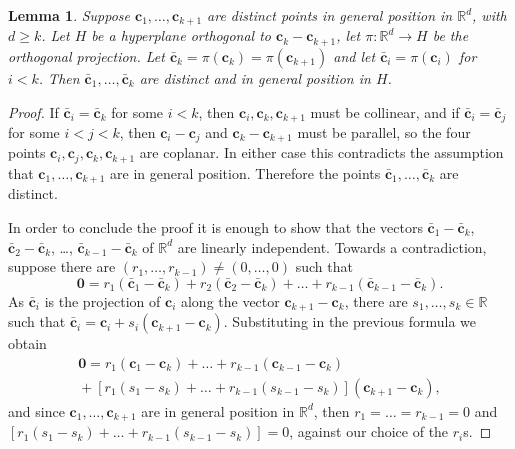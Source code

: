 \documentclass[12pt]{amsart}
\newcommand{\R}{\mathbb{R}}	%
\theoremstyle{plain}
\newtheorem{lemma}[theorem]{Lemma}
\theoremstyle{definition}
\theoremstyle{remark}
\begin{document}
\begin{lemma}\label{lem:projectiogeneralposition}
Suppose \( \mathbf{c}_1 , \dots , \mathbf{c}_{ k + 1 } \) are distinct points in general position in \( \R^d \), with \( d \geq k \).
Let \( H \) be a hyperplane orthogonal to \( \mathbf{c}_k - \mathbf{c}_{ k + 1 } \), let \( \pi \colon \R^d \to H \) be the orthogonal projection.
Let \( \bar{\mathbf{c}}_k = \pi ( \mathbf{c}_k ) = \pi ( \mathbf{c}_{ k + 1 } ) \) and let \( \bar{\mathbf{c}}_i = \pi ( \mathbf{c}_i ) \) for \( i < k \).
Then \( \bar{\mathbf{c}}_1 , \dots , \bar{\mathbf{c}}_k \) are distinct and in general position in \( H \).
\end{lemma}

\begin{proof}
If \( \bar{\mathbf{c}}_i = \bar{\mathbf{c}}_k \) for some \( i < k \), then \( \mathbf{c}_i , \mathbf{c}_k , \mathbf{c}_{ k + 1 } \) must be collinear, and if \( \bar{\mathbf{c}}_i = \bar{\mathbf{c}}_j \) for some \( i < j < k \), then \( \mathbf{c}_i - \mathbf{c}_j \) and \( \mathbf{c}_k - \mathbf{c}_{ k + 1 } \) must be parallel, so the four points \( \mathbf{c}_i , \mathbf{c}_j , \mathbf{c}_k , \mathbf{c}_{ k + 1 } \) are coplanar.
In either case this contradicts the assumption that \( \mathbf{c}_1 , \dots , \mathbf{c}_{k + 1} \) are in general position.
Therefore the points \( \bar{\mathbf{c}}_1 , \dots , \bar{\mathbf{c}}_k \) are distinct.

In order to conclude the proof it is enough to show that the vectors \( \bar{\mathbf{c}}_1 - \bar{\mathbf{c}}_{k} \), \( \bar{\mathbf{c}}_{2} - \bar{\mathbf{c}}_{k} \), \ldots , \( \bar{\mathbf{c}}_{ k - 1 } - \bar{\mathbf{c}}_{k} \) of \( \R^d \) are linearly independent.
Towards a contradiction, suppose there are \( ( r_1 , \dots , r_{ k - 1 } ) \neq ( 0 , \dots , 0 ) \) such that 
\[ 
\mathbf{0} = r_1 ( \bar{\mathbf{c}}_1 - \bar{\mathbf{c}}_{k} ) + r_2 ( \bar{\mathbf{c}}_2 - \bar{\mathbf{c}}_{k} ) + \dots + r_{ k - 1 }( \bar{\mathbf{c}}_{ k - 1 } - \bar{\mathbf{c}}_{k} ) .
\]
As \( \bar{\mathbf{c}}_i \) is the projection of \( \mathbf{c}_i \) along the vector \( \mathbf{c}_{ k + 1 } - \mathbf{c}_k \), there are \( s_1 , \dots , s_k \in \R \) such that \( \bar{\mathbf{c}}_i = \mathbf{c}_i + s_i ( \mathbf{c}_{ k + 1 } - \mathbf{c}_k ) \).
Substituting in the previous formula we obtain
\begin{multline*}
\mathbf{0} = r_1 ( \mathbf{c}_1 - \mathbf{c}_k ) + \dots + r_{ k - 1 } ( \mathbf{c}_{ k - 1 } - \mathbf{c}_k ) 
\\
{}+ [ r_1 ( s_1 - s_k ) + \dots + r_{ k - 1 } ( s_{k - 1 } - s_k ) ] ( \mathbf{c}_{ k + 1} - \mathbf{c}_k ) ,
\end{multline*}
and since \( \mathbf{c}_1 , \dots , \mathbf{c}_{k + 1} \) are in general position in \( \R^d \), then \( r_1 = \dots = r_{ k - 1} = 0 \) and \( [ r_1 ( s_1 - s_k ) + \dots + r_{ k - 1 } ( s_{k - 1 } - s_k ) ] = 0 \), against our choice of the \( r_i \)s.
\end{proof}
\end{document}
